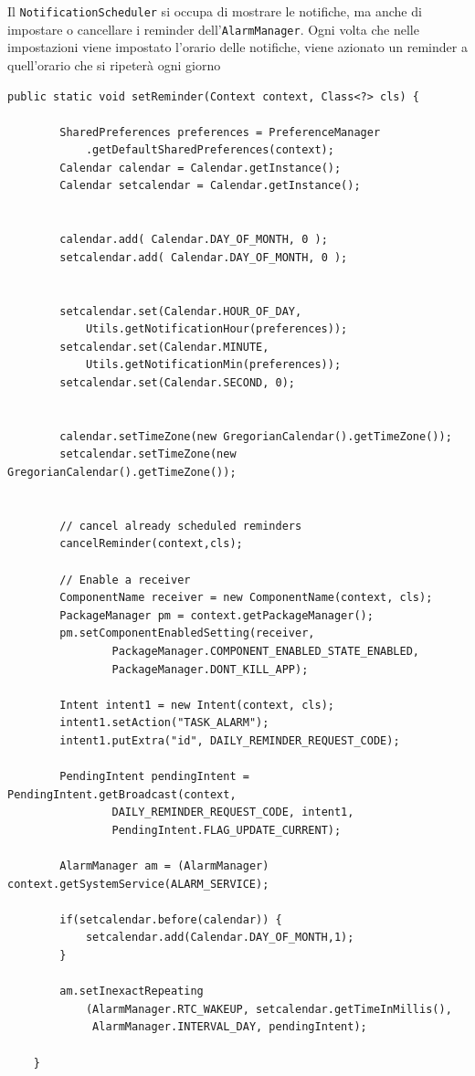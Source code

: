 \documentclass[]{article}
\begin{document}
Il \texttt{NotificationScheduler} si occupa di mostrare le notifiche, ma
anche di impostare o cancellare i reminder dell'\texttt{AlarmManager}.
Ogni volta che nelle impostazioni viene impostato l'orario delle
notifiche, viene azionato un reminder a quell'orario che si ripeterà
ogni giorno

\begin{verbatim}
public static void setReminder(Context context, Class<?> cls) {

        SharedPreferences preferences = PreferenceManager
            .getDefaultSharedPreferences(context);
        Calendar calendar = Calendar.getInstance();
        Calendar setcalendar = Calendar.getInstance();


        calendar.add( Calendar.DAY_OF_MONTH, 0 );
        setcalendar.add( Calendar.DAY_OF_MONTH, 0 );


        setcalendar.set(Calendar.HOUR_OF_DAY, 
            Utils.getNotificationHour(preferences));
        setcalendar.set(Calendar.MINUTE, 
            Utils.getNotificationMin(preferences));
        setcalendar.set(Calendar.SECOND, 0);


        calendar.setTimeZone(new GregorianCalendar().getTimeZone());
        setcalendar.setTimeZone(new GregorianCalendar().getTimeZone());


        // cancel already scheduled reminders
        cancelReminder(context,cls);

        // Enable a receiver
        ComponentName receiver = new ComponentName(context, cls);
        PackageManager pm = context.getPackageManager();
        pm.setComponentEnabledSetting(receiver,
                PackageManager.COMPONENT_ENABLED_STATE_ENABLED,
                PackageManager.DONT_KILL_APP);

        Intent intent1 = new Intent(context, cls);
        intent1.setAction("TASK_ALARM");
        intent1.putExtra("id", DAILY_REMINDER_REQUEST_CODE);

        PendingIntent pendingIntent = PendingIntent.getBroadcast(context,
                DAILY_REMINDER_REQUEST_CODE, intent1,
                PendingIntent.FLAG_UPDATE_CURRENT);

        AlarmManager am = (AlarmManager) context.getSystemService(ALARM_SERVICE);

        if(setcalendar.before(calendar)) {
            setcalendar.add(Calendar.DAY_OF_MONTH,1);
        }

        am.setInexactRepeating
            (AlarmManager.RTC_WAKEUP, setcalendar.getTimeInMillis(),
             AlarmManager.INTERVAL_DAY, pendingIntent);

    }
\end{verbatim}
\end{document}
